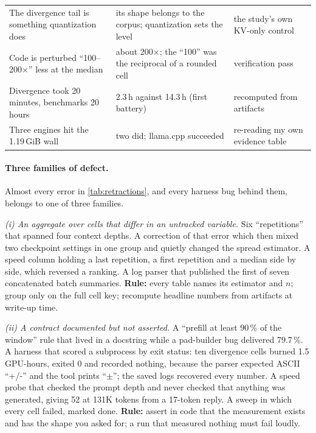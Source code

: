 \begin{table}[t]
\begin{tabularx}{\linewidth}{@{}>{\raggedright\arraybackslash}p{4.6cm}X>{\raggedright\arraybackslash}p{2.6cm}@{}}
The divergence tail is something quantization does & its shape belongs to the corpus; quantization sets the level & the study's own KV-only control \\
Code is perturbed ``100--200$\times$'' less at the median & about 200$\times$; the ``100'' was the reciprocal of a rounded cell & verification pass \\
Divergence took 20 minutes, benchmarks 20 hours & 2.3\,h against 14.3\,h (first battery) & recomputed from artifacts \\
Three engines hit the 1.19\,GiB wall & two did; llama.cpp succeeded & re-reading my own evidence table \\
\bottomrule
\end{tabularx}
\end{table}

\paragraph{Three families of defect.} Almost every error in \cref{tab:retractions}, and every harness
bug behind them, belongs to one of three families.

\emph{(i) An aggregate over cells that differ in an untracked variable.} Six ``repetitions'' that
spanned four context depths. A correction of that error which then mixed two checkpoint settings in
one group and quietly changed the spread estimator. A speed column holding a last repetition, a first
repetition and a median side by side, which reversed a ranking. A log parser that published the first
of seven concatenated batch summaries. \textbf{Rule:} every table names its estimator and $n$; group
only on the full cell key; recompute headline numbers from artifacts at write-up time.

\emph{(ii) A contract documented but not asserted.} A ``prefill at least 90\,\% of the window'' rule
that lived in a docstring while a pad-builder bug delivered 79.7\,\%. A harness that scored a
subprocess by exit status: ten divergence cells burned 1.5 GPU-hours, exited 0 and recorded nothing,
because the parser expected ASCII ``+/-'' and the tool prints ``$\pm$''; the saved logs recovered every
number. A speed probe that checked the prompt depth and never checked that anything was generated,
giving 52\tps{} at 131K tokens from a 17-token reply. A sweep in which every cell failed, marked done.
\textbf{Rule:} assert in code that the measurement exists and has the shape you asked for; a run that
measured nothing must fail loudly.

